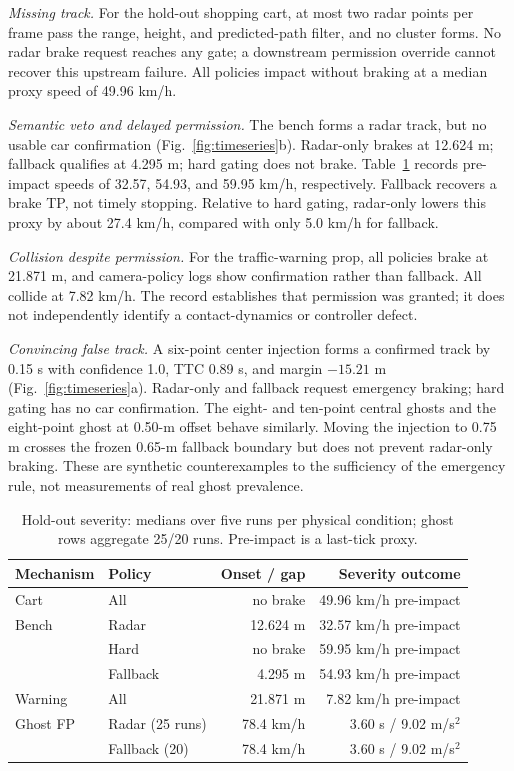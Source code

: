 \documentclass[conference]{IEEEtran}
\begin{document}
\emph{Missing track.} For the hold-out shopping cart, at most two radar points
per frame pass the range, height, and predicted-path filter, and no cluster
forms. No radar brake request reaches any gate; a downstream permission override
cannot recover this upstream failure. All policies
impact without braking at a median proxy speed of 49.96 km/h.

\emph{Semantic veto and delayed permission.} The bench forms a radar track, but no
usable car confirmation (Fig.~\ref{fig:timeseries}b). Radar-only brakes at 12.624 m; fallback qualifies at
4.295 m; hard gating does not brake. Table~\ref{tab:severity} records pre-impact
speeds of 32.57, 54.93, and 59.95 km/h, respectively. Fallback recovers a brake
TP, not timely stopping. Relative to hard gating, radar-only lowers this proxy
by about 27.4 km/h, compared with only 5.0 km/h for fallback.

\emph{Collision despite permission.} For the traffic-warning prop, all policies
brake at 21.871 m, and camera-policy logs show confirmation rather than fallback.
All collide at 7.82 km/h. The record establishes that permission was granted;
it does not independently identify a contact-dynamics or controller defect.

\emph{Convincing false track.} A six-point center injection forms a confirmed
track by 0.15 s with confidence 1.0, TTC 0.89 s, and margin $-15.21$ m
(Fig.~\ref{fig:timeseries}a).
Radar-only and fallback request emergency braking; hard gating has no car
confirmation. The eight- and ten-point central ghosts and the eight-point ghost at 0.50-m
offset behave similarly.
Moving the injection to 0.75 m crosses the frozen 0.65-m fallback boundary but
does not prevent radar-only braking. These are synthetic counterexamples to the
sufficiency of the emergency rule, not measurements of real ghost prevalence.

\begin{table}[t]
\caption{Hold-out severity: medians over five runs per physical condition; ghost rows aggregate 25/20 runs. Pre-impact is a last-tick proxy.}
\label{tab:severity}
\centering\scriptsize
\setlength{\tabcolsep}{3pt}
\begin{tabular}{llrr}
\toprule Mechanism & Policy & Onset / gap & Severity outcome\\ \midrule
Cart & All & no brake & 49.96 km/h pre-impact\\
Bench & Radar & 12.624 m & 32.57 km/h pre-impact\\
 & Hard & no brake & 59.95 km/h pre-impact\\
 & Fallback & 4.295 m & 54.93 km/h pre-impact\\
Warning & All & 21.871 m & 7.82 km/h pre-impact\\
\midrule
Ghost FP & Radar (25 runs) & 78.4 km/h & 3.60 s / 9.02 m/s$^2$\\
 & Fallback (20) & 78.4 km/h & 3.60 s / 9.02 m/s$^2$\\
\bottomrule
\end{tabular}
\end{table}
\end{document}
